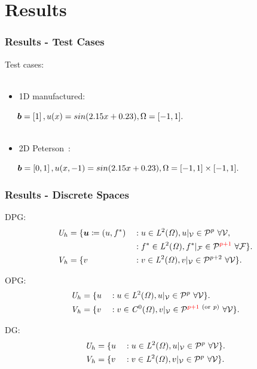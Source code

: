 \section{Results}

\begin{frame}
\frametitle{Results - Test Cases}

Test cases:
\\~

\begin{itemize}
  \item 1D manufactured:
\end{itemize}
$ \hspace{5mm} \mathit{\bm{{b}}} = \left[ 1 \right], u(x) = sin(2.15 x + 0.23), \Omega = [-1,1].$
\\~

\begin{itemize}
  \item 2D Peterson~\cite{Peterson1991}:
\end{itemize}
$ \hspace{5mm} \mathit{\bm{{b}}} = \left[ 0, 1 \right], u(x,-1) = sin(2.15 x + 0.23), \Omega = [-1,1] \times [-1,1].$

\end{frame}

\begin{frame}
\frametitle{Results - Discrete Spaces}

DPG:
\begin{alignat}{3}
& \fspace{U}_h = \{ \varv{u} \coloneqq (u,f^*) && : u \in \fspace{L}^2(\fspace{\Omega}), u|_{\fe{V}} \in \mathcal{P}^{p}\ \forall \fe{V}, \\
                                             &  && : f^* \in \fspace{L}^2(\fspace{\Omega}), f^*|_{\fe{F}} \in \mathcal{P}^\makered{p+1}\ \forall \fe{F} \}. \\
& \fspace{V}_h = \{ v && : v \in \fspace{L}^2(\fspace{\Omega}), v|_{\fe{V}} \in \mathcal{P}^{p+2}\ \forall \fe{V} \}.
\end{alignat}

OPG:
\begin{alignat}{3}
& \mathit{{{U}}}_h = \{ u && : u \in \mathit{{{L}}}^2(\mathit{{{\Omega}}}), u|_{\mathcal{{{V}}}} \in \mathcal{P}^{p}\ \forall \mathcal{{{V}}} \}. \\
& \mathit{{{V}}}_h = \{ v && : v \in \mathit{{{C}}}^0(\mathit{{{\Omega}}}), v|_{\mathcal{{{V}}}} \in \mathcal{P}^{{\color{red}p+1}\ (\text{or}\ p)}\ \forall \mathcal{{{V}}} \}.
\end{alignat}

DG:
\begin{alignat}{3}
& \mathit{{{U}}}_h = \{ u && : u \in \mathit{{{L}}}^2(\mathit{{{\Omega}}}), u|_{\mathcal{{{V}}}} \in \mathcal{P}^{p}\ \forall \mathcal{{{V}}} \}. \\
& \mathit{{{V}}}_h = \{ v && : v \in \mathit{{{L}}}^2(\mathit{{{\Omega}}}), v|_{\mathcal{{{V}}}} \in \mathcal{P}^{p}\ \forall \mathcal{{{V}}} \}.
\end{alignat}

\end{frame}

